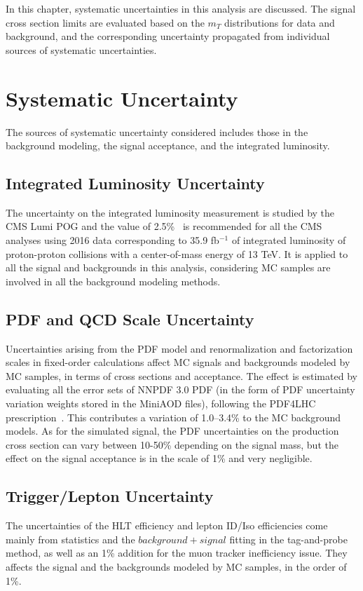 In this chapter, systematic uncertainties in this analysis are discussed. The signal cross section limits are evaluated based on the $m_T$ distributions for data and background, and the corresponding uncertainty propagated from individual sources of systematic uncertainties.
\section{Systematic Uncertainty}
The sources of systematic uncertainty considered includes those in the background modeling, the signal acceptance, and the integrated luminosity.
\subsection{Integrated Luminosity Uncertainty}
The uncertainty on the integrated luminosity measurement is studied by the CMS Lumi POG and the value of 2.5\%~\cite{sys_lumi} is recommended for all the CMS analyses using 2016 data corresponding to 35.9 fb$^{-1}$ of integrated luminosity of proton-proton collisions with a center-of-mass energy of 13 TeV. It is applied to all the signal and backgrounds in this analysis, considering MC samples are involved in all the background modeling methods.
\subsection{PDF and QCD Scale Uncertainty}
Uncertainties arising from the PDF model and renormalization and factorization scales in fixed-order calculations affect MC signals and backgrounds modeled by MC samples, in terms of cross sections and acceptance. The effect is estimated by evaluating all the error sets of NNPDF 3.0 PDF (in the form of PDF uncertainty variation weights stored in the MiniAOD files), following the PDF4LHC prescription~\cite{sample_pdf4lhc}. This contributes a variation of 1.0–3.4\% to the MC background models. As for the simulated signal, the PDF uncertainties on the production cross section can vary between 10-50\% depending on the signal mass, but the effect on the signal acceptance is in the scale of 1\% and very negligible.
\subsection{Trigger/Lepton Uncertainty}
The uncertainties of the HLT efficiency and lepton ID/Iso efficiencies come mainly from statistics and the $background+signal$ fitting in the tag-and-probe method, as well as an 1\% addition for the muon tracker inefficiency issue. They affects the signal and the backgrounds modeled by MC samples, in the order of 1\%. 
